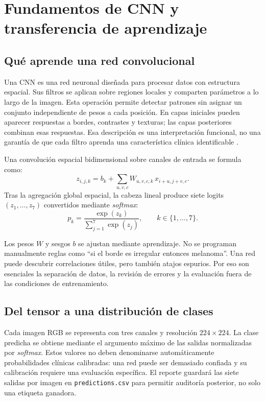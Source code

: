 \FloatBarrier\section{Fundamentos de CNN y transferencia de aprendizaje}

\subsection{Qué aprende una red convolucional}
Una CNN es una red neuronal diseñada para procesar datos con estructura espacial. Sus filtros se aplican sobre regiones locales y comparten parámetros a lo largo de la imagen. Esta operación permite detectar patrones sin asignar un conjunto independiente de pesos a cada posición. En capas iniciales pueden aparecer respuestas a bordes, contrastes y texturas; las capas posteriores combinan esas respuestas. Esa descripción es una interpretación funcional, no una garantía de que cada filtro aprenda una característica clínica identificable \cite{goodfellow2016}.

\begin{tcolorbox}[teoriaBox,title={Operación de convolución discreta y proyección multiclase}]
Una convolución espacial bidimensional sobre canales de entrada se formula como:
\begin{equation}
z_{i,j,k}=b_k+\sum_{u,v,c}W_{u,v,c,k}\,x_{i+u,j+v,c}.
\end{equation}
Tras la agregación global espacial, la cabeza lineal produce siete logits $(z_1,\dots,z_7)$ convertidos mediante \textit{softmax}:
\begin{equation}
p_k=\frac{\exp(z_k)}{\sum_{j=1}^{7}\exp(z_j)},\qquad k \in \{1,\dots,7\}.
\end{equation}
\end{tcolorbox}

Los pesos $W$ y sesgos $b$ se ajustan mediante aprendizaje. No se programan manualmente reglas como ``si el borde es irregular entonces melanoma''. Una red puede descubrir correlaciones útiles, pero también atajos espurios. Por eso son esenciales la separación de datos, la revisión de errores y la evaluación fuera de las condiciones de entrenamiento.

\subsection{Del tensor a una distribución de clases}
Cada imagen RGB se representa con tres canales y resolución $224\times224$. La clase predicha se obtiene mediante el argumento máximo de las salidas normalizadas por \textit{softmax}. Estos valores no deben denominarse automáticamente probabilidades clínicas calibradas: una red puede ser demasiado confiada y su calibración requiere una evaluación específica. El reporte guardará las siete salidas por imagen en \texttt{predictions.csv} para permitir auditoría posterior, no solo una etiqueta ganadora.

